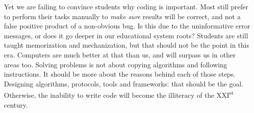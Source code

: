 Yet we are failing to convince students why coding is important. Most still prefer to perform their tasks manually to \textit{make sure} results will be correct, and not a false positive product of a non-obvious bug. Is this due to the uninformative error messages, or does it go deeper in our educational system roots? Students are still taught memorization and mechanization, but that should not be the point in this era. Computers are much better at that than us, and will surpass us in other areas too. Solving problems is not about copying algorithms and following instructions. It should be more about the reasons behind each of those steps. Designing algorithms, protocols, tools and frameworks: that should be the goal. Otherwise, the inability to write code will become the illiteracy of the XXI\textsuperscript{st} century.